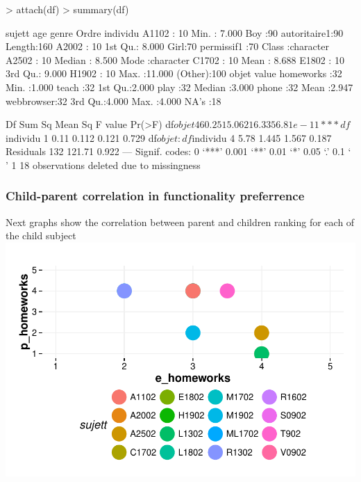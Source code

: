 \documentclass{article}
\begin{document}
\begin{Schunk}
\begin{Sinput}
> attach(df)
> summary(df)
\end{Sinput}
\begin{Soutput}
     sujett         age          genre             Ordre      individu        
 A1102  : 10   Min.   : 7.000   Boy :90   autoritaire1:90   Length:160        
 A2002  : 10   1st Qu.: 8.000   Girl:70   permissif1  :70   Class :character  
 A2502  : 10   Median : 8.500                               Mode  :character  
 C1702  : 10   Mean   : 8.688                                                 
 E1802  : 10   3rd Qu.: 9.000                                                 
 H1902  : 10   Max.   :11.000                                                 
 (Other):100                                                                  
        objet        value      
 homeworks :32   Min.   :1.000  
 teach     :32   1st Qu.:2.000  
 play      :32   Median :3.000  
 phone     :32   Mean   :2.947  
 webbrowser:32   3rd Qu.:4.000  
                 Max.   :4.000  
                 NA's   :18     
\end{Soutput}
\begin{Soutput}
                      Df Sum Sq Mean Sq F value   Pr(>F)    
df$objet               4  60.25  15.062  16.335 6.81e-11 ***
df$individu            1   0.11   0.112   0.121    0.729    
df$objet:df$individu   4   5.78   1.445   1.567    0.187    
Residuals            132 121.71   0.922                     
---
Signif. codes:  0 ‘***’ 0.001 ‘**’ 0.01 ‘*’ 0.05 ‘.’ 0.1 ‘ ’ 1
18 observations deleted due to missingness
\end{Soutput}
\end{Schunk}

\subsubsection{Child-parent correlation in functionality preferrence} 
Next graphs show the correlation between parent and children ranking for each of the child subject\newline
\includegraphics{interviews/interviews-plot_coirs_parent_enfant_hmk}
\end{document}
